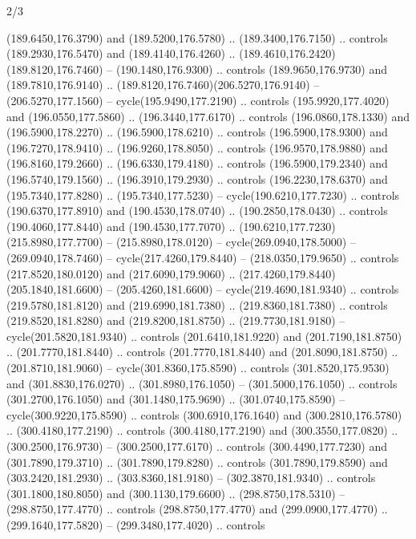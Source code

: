 \begin{flagdescription}{2/3}
\begin{scope}[xshift=0.5\flaglength,yshift=0.5\flagwidth,scale=\flagwidth/259.2]
\begin{scope}[y=0.8pt, x=0.8pt, yscale=-1,shift={(-243,-162)}]
      (189.6450,176.3790) and (189.5200,176.5780) .. (189.3400,176.7150) .. controls
      (189.2930,176.5470) and (189.4140,176.4260) ..
      (189.4610,176.2420)(189.8120,176.7460) -- (190.1480,176.9300) .. controls
      (189.9650,176.9730) and (189.7810,176.9140) ..
      (189.8120,176.7460)(206.5270,176.9140) -- (206.5270,177.1560) --
      cycle(195.9490,177.2190) .. controls (195.9920,177.4020) and
      (196.0550,177.5860) .. (196.3440,177.6170) .. controls (196.0860,178.1330) and
      (196.5900,178.2270) .. (196.5900,178.6210) .. controls (196.5900,178.9300) and
      (196.7270,178.9410) .. (196.9260,178.8050) .. controls (196.9570,178.9880) and
      (196.8160,179.2660) .. (196.6330,179.4180) .. controls (196.5900,179.2340) and
      (196.5740,179.1560) .. (196.3910,179.2930) .. controls (196.2230,178.6370) and
      (195.7340,177.8280) .. (195.7340,177.5230) -- cycle(190.6210,177.7230) ..
      controls (190.6370,177.8910) and (190.4530,178.0740) .. (190.2850,178.0430) ..
      controls (190.4060,177.8440) and (190.4530,177.7070) ..
      (190.6210,177.7230)(215.8980,177.7700) -- (215.8980,178.0120) --
      cycle(269.0940,178.5000) -- (269.0940,178.7460) -- cycle(217.4260,179.8440) --
      (218.0350,179.9650) .. controls (217.8520,180.0120) and (217.6090,179.9060) ..
      (217.4260,179.8440)(205.1840,181.6600) -- (205.4260,181.6600) --
      cycle(219.4690,181.9340) .. controls (219.5780,181.8120) and
      (219.6990,181.7380) .. (219.8360,181.7380) .. controls (219.8520,181.8280) and
      (219.8200,181.8750) .. (219.7730,181.9180) -- cycle(201.5820,181.9340) ..
      controls (201.6410,181.9220) and (201.7190,181.8750) .. (201.7770,181.8440) ..
      controls (201.7770,181.8440) and (201.8090,181.8750) .. (201.8710,181.9060) --
      cycle(301.8360,175.8590) .. controls (301.8520,175.9530) and
      (301.8830,176.0270) .. (301.8980,176.1050) -- (301.5000,176.1050) .. controls
      (301.2700,176.1050) and (301.1480,175.9690) .. (301.0740,175.8590) --
      cycle(300.9220,175.8590) .. controls (300.6910,176.1640) and
      (300.2810,176.5780) .. (300.4180,177.2190) .. controls (300.4180,177.2190) and
      (300.3550,177.0820) .. (300.2500,176.9730) -- (300.2500,177.6170) .. controls
      (300.4490,177.7230) and (301.7890,179.3710) .. (301.7890,179.8280) .. controls
      (301.7890,179.8590) and (303.2420,181.2930) .. (303.8360,181.9180) --
      (302.3870,181.9340) .. controls (301.1800,180.8050) and (300.1130,179.6600) ..
      (298.8750,178.5310) -- (298.8750,177.4770) .. controls (298.8750,177.4770) and
      (299.0900,177.4770) .. (299.1640,177.5820) -- (299.3480,177.4020) .. controls

\end{scope}
\end{scope}
\end{flagdescription}
